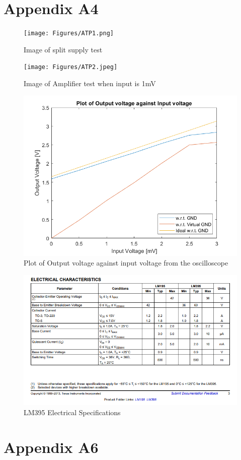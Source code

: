 \documentclass[class=report,11pt,crop=false]{standalone}
\begin{document}
	\chapter{Appendix A4}
	\begin{figure}[h!]
		\centering
		\texttt{[image: Figures/ATP1.png]}
		\caption{Image of split supply test}
		\label{fig:S7}
	\end{figure}
	\begin{figure}[h!]
		\centering
		\texttt{[image: Figures/ATP2.jpeg]}
		\caption{Image of Amplifier test when input is 1mV}
		\label{fig:S8}
	\end{figure}
	\begin{figure}[h!]
		\centering
		\includegraphics[width=0.4\linewidth]{Figures/Result1.png}
		\caption{Plot of Output voltage against input voltage from the oscilloscope}
		\label{fig:S11}
	\end{figure}
	\begin{figure}[h!]
		\centering
		\includegraphics[width=0.4\linewidth]{Figures/LM395 SPECS.png}
		\caption{LM395 Electrical Specifications}
		\label{fig:P5}
	\end{figure}
	
	\chapter{Appendix A6}
\end{document}
